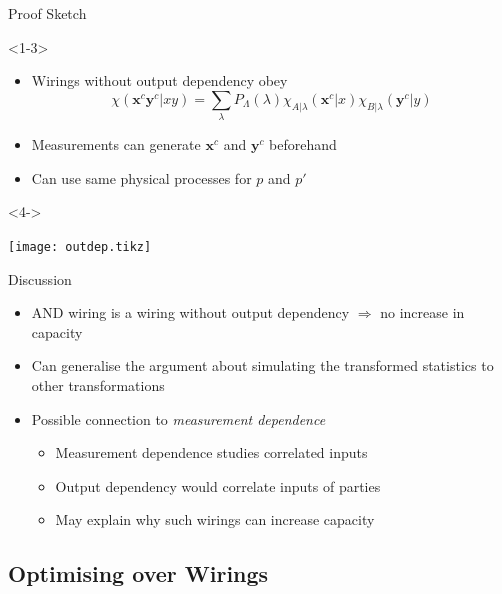 \documentclass[xcolor=dvipsnames]{beamer}
\newcommand{\?}{\mathrel{?}} %
\newcommand{\cvec}[1]{\boldsymbol{\mathbf{#1}}}    %
\begin{document}
\begin{frame}{Proof Sketch}
  \begin{onlyenv}<1-3>
    \begin{itemize}[<+->]
      \item Wirings without output dependency obey
        \[ \chi(\cvec{x}^c\cvec{y}^c|xy) = \sum_{\lambda} P_{\Lambda}(\lambda) \chi_{A|\lambda}(\cvec{x}^c|x) \chi_{B|\lambda}(\cvec{y}^c|y) \]
      \item Measurements can generate \(\cvec{x}^c\) and \(\cvec{y}^c\) beforehand
      \item Can use same physical processes for \(p\) and \(p'\)
    \end{itemize}
  \end{onlyenv}
  \begin{onlyenv}<4->
    \begin{center}
      \texttt{[image: outdep.tikz]}
    \end{center}
  \end{onlyenv}
\end{frame}


\begin{frame}{Discussion}
  \begin{itemize}[<+->]
    \item AND wiring is a wiring without output dependency \(\Rightarrow\) no increase in capacity
    \item Can generalise the argument about simulating the transformed statistics to other transformations
    \item Possible connection to \emph{measurement dependence}
      \begin{itemize}
        \item Measurement dependence studies correlated inputs
        \item Output dependency would correlate inputs of parties
        \item May explain why such wirings can increase capacity
      \end{itemize}
  \end{itemize}
\end{frame}

\subsection{Optimising over Wirings}
\end{document}
